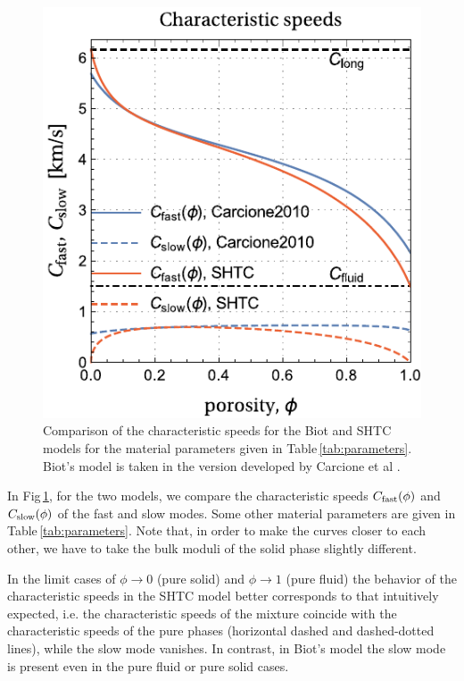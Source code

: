 \documentclass[3p,times,table]{article}
\begin{document}
\begin{figure}[!htbp]
	\begin{center}
		\includegraphics[draft=false,trim=0 -5 0 0,clip, 
		scale=0.75]{Figures/Characteristics}
		\caption{Comparison of the characteristic speeds for the Biot and SHTC 
		models for the material parameters given in 
		Table\,\ref{tab:parameters}. Biot's model is taken in the version developed by 
		Carcione et al \cite{Carcione2010}.  
				}  
		\label{fig:diff.grain.modulus}
	\end{center}
\end{figure}


In Fig\,\ref{fig:diff.grain.modulus}, for the two models, we compare the 
characteristic speeds $ C_{\rm fast}(\phi) $ and $ C_{\rm 
slow}(\phi) $ of the fast 
and slow modes. Some other material parameters 
are given in Table\,\ref{tab:parameters}. Note that, in order to make the 
curves closer to each other, we have to take the bulk moduli of the solid 
phase slightly different. 

In the limit cases 
of $ \phi \to 0 $ (pure solid) and $ \phi \to 1 $ (pure fluid) the behavior of 
the characteristic speeds in the SHTC model better corresponds to that 
intuitively 
expected, i.e. the characteristic speeds of the mixture coincide with the 
characteristic speeds of the pure phases (horizontal dashed and dashed-dotted 
lines), while the slow mode vanishes. In 
contrast, in Biot's model the slow mode is present even in the pure fluid or 
pure solid cases. 
\end{document}
